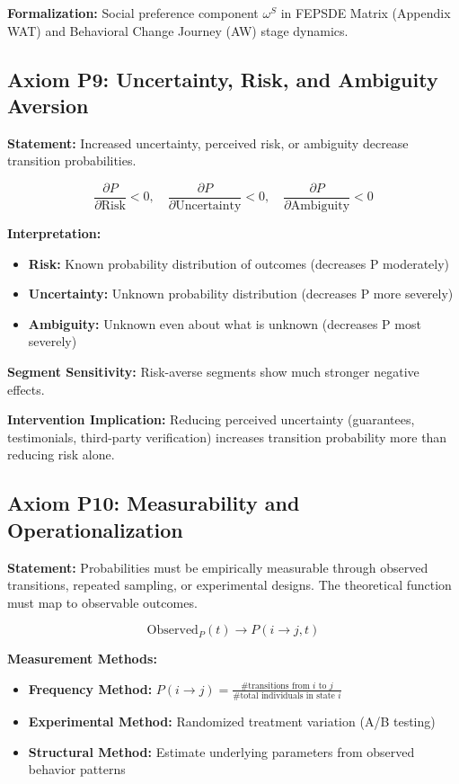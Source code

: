 \documentclass[11pt, a4paper]{article}
\begin{document}
\textbf{Formalization:} Social preference component $\omega^S$ in FEPSDE Matrix (Appendix WAT) and Behavioral Change Journey (AW) stage dynamics.

\subsection{Axiom P9: Uncertainty, Risk, and Ambiguity Aversion}

\textbf{Statement:} Increased uncertainty, perceived risk, or ambiguity decrease transition probabilities.

\begin{equation}
\frac{\partial P}{\partial \text{Risk}} < 0, \quad \frac{\partial P}{\partial \text{Uncertainty}} < 0, \quad \frac{\partial P}{\partial \text{Ambiguity}} < 0
\end{equation}

\textbf{Interpretation:}
\begin{itemize}[nosep]
    \item \textbf{Risk:} Known probability distribution of outcomes (decreases P moderately)
    \item \textbf{Uncertainty:} Unknown probability distribution (decreases P more severely)
    \item \textbf{Ambiguity:} Unknown even about what is unknown (decreases P most severely)
\end{itemize}

\textbf{Segment Sensitivity:} Risk-averse segments show much stronger negative effects.

\textbf{Intervention Implication:} Reducing perceived uncertainty (guarantees, testimonials, third-party verification) increases transition probability more than reducing risk alone.

\subsection{Axiom P10: Measurability and Operationalization}

\textbf{Statement:} Probabilities must be empirically measurable through observed transitions, repeated sampling, or experimental designs. The theoretical function must map to observable outcomes.

\begin{equation}
\text{Observed}_P(t) \to P(i \to j, t)
\end{equation}

\textbf{Measurement Methods:}
\begin{itemize}[nosep]
    \item \textbf{Frequency Method:} $P(i \to j) = \frac{\text{\# transitions from } i \text{ to } j}{\text{\# total individuals in state } i}$
    \item \textbf{Experimental Method:} Randomized treatment variation (A/B testing)
    \item \textbf{Structural Method:} Estimate underlying parameters from observed behavior patterns
\end{itemize}
\end{document}
